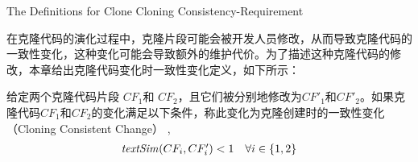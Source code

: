 




{The Definitions for Clone Cloning Consistency-Requirement}

在克隆代码的演化过程中，克隆片段可能会被开发人员修改，从而导致克隆代码的一致性变化，这种变化可能会导致额外的维护代价。为了描述这种克隆代码的修改，本章给出克隆代码变化时一致性变化定义，如下所示：\\

\begin{definition}
\label{def-cloningchange}
给定两个克隆代码片段 $CF_1$和 $CF_2$，且它们被分别地修改为$CF'_1$和$CF'_2$。如果克隆代码$CF_1$和$CF_2$的变化满足以下条件，称此变化为{克隆创建时的一致性变化（Cloning Consistent Change）} , 
  \[
  \begin{array}[t]{cr}
    \mathit{textSim}(CF_i, CF'_i) < 1 & \forall i \in \{1,2\}  \\
  \end{array}
  \]
\end{definition}

